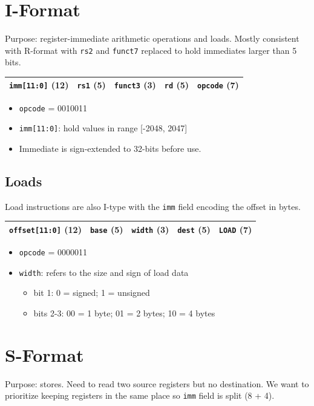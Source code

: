 \section{I-Format}
Purpose: register-immediate arithmetic operations and loads. Mostly consistent with R-format with \texttt{rs2} and \texttt{funct7} replaced to hold immediates larger than 5 bits.

\medskip
\begin{tabular}{|c|c|c|c|c|}
    \hline
    \texttt{imm[11:0]} (12) &
    \texttt{rs1} (5) &
    \texttt{funct3} (3) &
    \texttt{rd} (5) &
    \texttt{opcode} (7) \\
    \hline
\end{tabular}
\begin{itemize}
    \item \texttt{opcode} = 0010011
    \item \texttt{imm[11:0]}: hold values in range [-2048, 2047]
    \item Immediate is sign-extended to 32-bits before use.
\end{itemize}

\subsection{Loads}
Load instructions are also I-type with the \texttt{imm} field encoding the offset in bytes.

\medskip
\begin{tabular}{|c|c|c|c|c|}
    \hline
    \texttt{offset[11:0]} (12) &
    \texttt{base} (5) &
    \texttt{width} (3) &
    \texttt{dest} (5) &
    \texttt{LOAD} (7) \\
    \hline
\end{tabular}
\begin{itemize}
    \item \texttt{opcode} = 0000011
    \item \texttt{width}: refers to the size and sign of load data
    \begin{itemize}
        \item bit 1: 0 = signed; 1 = unsigned
        \item bits 2-3: 00 = 1 byte; 01 = 2 bytes; 10 = 4 bytes
    \end{itemize}
\end{itemize}

\section{S-Format}
Purpose: stores. Need to read two source registers but no destination. We want to prioritize keeping registers in the same place so \texttt{imm} field is split (8 + 4).

